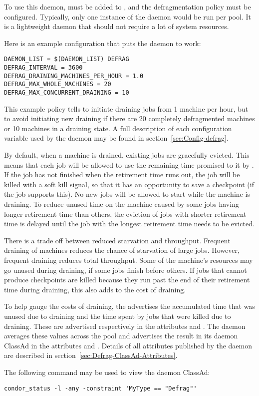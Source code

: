 To use this daemon,
 must be added to ,
and the defragmentation policy must be configured.
Typically, only one instance of the  daemon would be
run per pool.  
It is a lightweight daemon that should not require a lot of system resources.

Here is an example configuration that puts the  daemon to work:

\begin{verbatim}
DAEMON_LIST = $(DAEMON_LIST) DEFRAG
DEFRAG_INTERVAL = 3600
DEFRAG_DRAINING_MACHINES_PER_HOUR = 1.0
DEFRAG_MAX_WHOLE_MACHINES = 20
DEFRAG_MAX_CONCURRENT_DRAINING = 10
\end{verbatim}

This example policy tells  to initiate draining 
jobs from 1 machine per hour,
but to avoid initiating new draining if there are 
20 completely defragmented machines or 10 machines in a draining state.
A full description of each configuration variable
used by the  daemon may be found in 
section~\ref{sec:Config-defrag}.

By default, when a machine is drained, existing jobs are gracefully evicted.
This means that each job will be allowed to use the remaining
time promised to it by .  
If the job has not finished when the retirement time runs out, 
the job will be killed with a soft kill signal, 
so that it has an opportunity to save a checkpoint
(if the job supports this).
No new jobs will be allowed to start while the machine is draining.
To reduce unused time on the
machine caused by some jobs having longer retirement time than others,
the eviction of jobs with shorter retirement time is delayed until the
job with the longest retirement time needs to be evicted.

There is a trade off between reduced starvation and throughput.
Frequent draining of machines reduces the chance of starvation of
large jobs.  However, frequent draining reduces total throughput.
Some of the machine's resources may go unused during draining,
if some jobs finish before others.  
If jobs that cannot produce checkpoints are killed
because they run past the end of their retirement time during draining,
this also adds to the cost of draining.

To help gauge the costs of draining, the  advertises
the accumulated time that was unused due to draining and the time
spent by jobs that were killed due to draining.  
These are advertised
respectively in the attributes  and
.  
The  daemon
averages these values across the pool and advertises the result in its
daemon ClassAd in the attributes  and
.  
Details of all attributes published by
the  daemon are described in
section~\ref{sec:Defrag-ClassAd-Attributes}.

The following command may be used to view the  daemon
ClassAd:

\begin{verbatim}
condor_status -l -any -constraint 'MyType == "Defrag"'
\end{verbatim}

